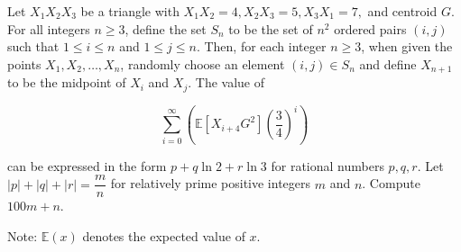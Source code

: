 Let $X_1X_2X_3$ be a triangle with $X_1X_2 = 4, X_2X_3 = 5, X_3X_1 = 7,$ and centroid $G$. For all integers $n \ge 3$, define the set $S_n$ to be the set of $n^2$ ordered pairs $(i,j)$ such that $1\le i\le n$ and $1\le j\le n$. Then, for each integer $n\ge 3$, when given the points $X_1, X_2, \ldots , X_{n}$, randomly choose an element $(i,j)\in S_n$ and define $X_{n+1}$ to be the midpoint of $X_i$ and $X_j$. The value of

\[ \sum_{i=0}^\infty \left(\mathbb{E}\left[X_{i+4}G^2\right]\left(\dfrac{3}{4}\right)^i\right) \]

can be expressed in the form $p + q \ln 2 + r \ln 3$ for rational numbers $p, q, r$. Let $|p| + |q| + |r| = \dfrac mn$ for relatively prime positive integers $m$ and $n$. Compute $100m+n$.

Note: $\mathbb{E}(x)$ denotes the expected value of $x$.
